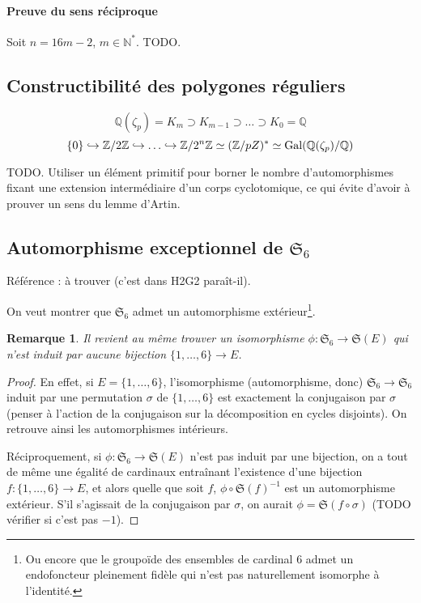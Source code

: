\documentclass[a4paper, 11pt]{article}
\def\Z{\mathbb{Z}}
\def\N{\mathbb{N}}
\def\Q{\mathbb{Q}}
\def\Sigmap{\mathfrak{S}}
\newtheorem*{remark}{Remarque}
\begin{document}
\paragraph{Preuve du sens réciproque}

Soit $n = 16m - 2$, $m \in \N^*$. TODO.


\subsection{Constructibilité des polygones réguliers}

\[ \Q(\zeta_p) = K_m \supset K_{m-1} \supset \ldots \supset K_0 = \Q \]
\[ \{0\} \hookrightarrow \Z/2\Z \hookrightarrow \ldots \hookrightarrow \Z/2^n\Z
  \simeq (\Z/pZ)^* \simeq \textnormal{Gal}(\Q(\zeta_p)/\Q) \]

TODO. Utiliser un élément primitif pour borner le nombre d'automorphismes fixant
une extension intermédiaire d'un corps cyclotomique, ce qui évite d'avoir à
prouver un sens du lemme d'Artin.

\subsection{Automorphisme exceptionnel de $\Sigmap_6$}

Référence : à trouver (c'est dans H2G2 paraît-il).

On veut montrer que $\Sigmap_6$ admet un automorphisme extérieur\footnote{Ou
  encore que le groupoïde des ensembles de cardinal 6 admet un endofoncteur
  pleinement fidèle qui n'est pas naturellement isomorphe à l'identité.}.

\begin{remark}
  Il revient au même trouver un isomorphisme $\phi : \Sigmap_6 \to \Sigmap(E)$
  qui n'est induit par aucune bijection $\{1,\ldots,6\} \to E$.
\end{remark}
\begin{proof}
  En effet, si $E = \{1,\ldots,6\}$, l'isomorphisme (automorphisme, donc)
  $\Sigmap_6 \to \Sigmap_6$ induit par une permutation $\sigma$ de
  $\{1,\ldots,6\}$ est exactement la conjugaison par $\sigma$ (penser à l'action
  de la conjugaison sur la décomposition en cycles disjoints). On retrouve ainsi
  les automorphismes intérieurs.

  Réciproquement, si $\phi : \Sigmap_6 \to \Sigmap(E)$ n'est pas induit par une
  bijection, on a tout de même une égalité de cardinaux entraînant l'existence
  d'une bijection $f : \{1,\ldots,6\} \to E$, et alors quelle que soit $f$,
  $\phi \circ \Sigmap(f)^{-1}$ est un automorphisme extérieur. S'il s'agissait
  de la conjugaison par $\sigma$, on aurait $\phi = \Sigmap(f \circ \sigma)$
  (TODO vérifier si c'est pas $-1$).
\end{proof}
\end{document}
